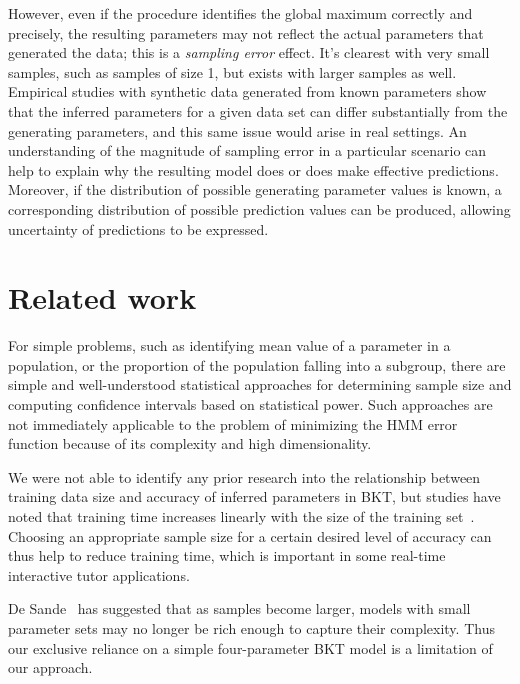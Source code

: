 \documentclass{edm_template}
\begin{document}
However, even if the procedure identifies the global maximum correctly and precisely, the resulting
parameters may not reflect the actual parameters that generated the data; this is a \emph{sampling error}
effect. It's clearest with very small samples, such as samples of size 1, but exists with larger samples as well. Empirical studies with synthetic data generated from known parameters show that the inferred parameters for a given data set can differ substantially from the generating parameters, and this same issue would arise in real settings. An understanding of the magnitude of sampling error in a particular scenario
can help to explain why the resulting model does or does make effective predictions. Moreover, if the
distribution of possible generating parameter values is known, a corresponding distribution of possible prediction values can be produced, allowing uncertainty of predictions to be expressed.

\section{Related work}
For simple problems, such as identifying mean value of a parameter in a population, or the proportion of the population falling into a subgroup, there are simple and well-understood statistical approaches for determining sample size and computing confidence intervals based on statistical power. Such approaches are not immediately applicable to the problem of minimizing the HMM error function because of its complexity and high dimensionality.

We were not able to identify any prior research into the relationship between training data size and accuracy of inferred parameters in BKT, but studies have noted that training time increases linearly with the size of the training set~\cite{falakmasir2013spectral}. Choosing an appropriate sample size for a certain desired level of accuracy can thus help to reduce training time, which is important in some real-time interactive tutor applications.


De Sande~\cite{vandesande2013} has suggested that as samples become larger, models with small parameter sets  may no longer be rich enough to capture their complexity. Thus our exclusive reliance on a simple four-parameter BKT model is a limitation of our approach.
\end{document}
